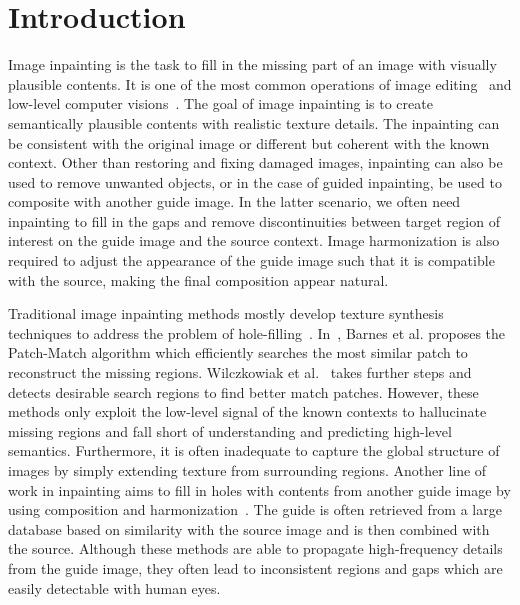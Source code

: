 \section{Introduction}
Image inpainting is the task to fill in the missing part of an image with visually plausible contents. It is one of the most common operations of image editing~\cite{gatys2015texture} and low-level computer visions~\cite{komodakis2006image,hays2007scene}. The goal of image inpainting is to create semantically plausible contents with realistic texture details. The inpainting can be consistent with the original image or different but coherent with the known context. Other than restoring and fixing damaged images, inpainting can also be used to remove unwanted objects, or in the case of guided inpainting, be used to composite with another guide image. In the latter scenario, we often need inpainting to fill in the gaps and remove discontinuities between target region of interest on the guide image and the source context. Image harmonization is also required to adjust the appearance of the guide image such that it is compatible with the source, making the final composition appear natural. 

Traditional image inpainting methods mostly develop texture synthesis techniques to address the problem of hole-filling~\cite{bertalmio2000image,komodakis2006image,wexler2004space,barnes2009patchmatch,bertalmio2003simultaneous,wilczkowiak2005hole}. In~\cite{barnes2009patchmatch}, Barnes et al. proposes the Patch-Match algorithm which efficiently searches the most similar patch to reconstruct the missing regions. Wilczkowiak et al.~\cite{wilczkowiak2005hole} takes further steps and detects desirable search regions to find better match patches. However, these methods only exploit the low-level signal of the known contexts to hallucinate missing regions and fall short of understanding and predicting high-level semantics. Furthermore, it is often inadequate to capture the global structure of images by simply extending texture from surrounding regions. Another line of work in inpainting aims to fill in holes with contents from another guide image by using composition and harmonization~\cite{hays2007scene,tsai2017deep}. The guide is often retrieved from a large database based on similarity with the source image and is then combined with the source. Although these methods are able to propagate high-frequency details from the guide image, they often lead to inconsistent regions and gaps which are easily detectable with human eyes.  

